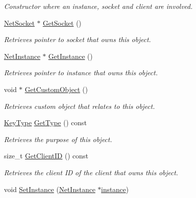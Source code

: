 \begin{DoxyCompactItemize}
\begin{DoxyCompactList}\small\item\em Constructor where an instance, socket and client are involved. \item\end{DoxyCompactList}\item 
\hyperlink{class_net_socket}{NetSocket} $\ast$ \hyperlink{class_completion_key_a9e785a464b4c5ade148d506d9e8eeeef}{GetSocket} ()
\begin{DoxyCompactList}\small\item\em Retrieves pointer to socket that owns this object. \item\end{DoxyCompactList}\item 
\hyperlink{class_net_instance}{NetInstance} $\ast$ \hyperlink{class_completion_key_a80c10491545d7a2de283e301d970b1d6}{GetInstance} ()
\begin{DoxyCompactList}\small\item\em Retrieves pointer to instance that owns this object. \item\end{DoxyCompactList}\item 
void $\ast$ \hyperlink{class_completion_key_acbf632d51b18ec2717be3f93b09ed52a}{GetCustomObject} ()
\begin{DoxyCompactList}\small\item\em Retrieves custom object that relates to this object. \item\end{DoxyCompactList}\item 
\hyperlink{class_completion_key_ad0789e8ca951edd8ee5b1b2fb7cdd8b4}{KeyType} \hyperlink{class_completion_key_a2d61a4bec4faff98ddacc896a89fe458}{GetType} () const 
\begin{DoxyCompactList}\small\item\em Retrieves the purpose of this object. \item\end{DoxyCompactList}\item 
size\_\-t \hyperlink{class_completion_key_ac42a83d6549a4fc3cfc9a336b08704f9}{GetClientID} () const 
\begin{DoxyCompactList}\small\item\em Retrieves the client ID of the client that owns this object. \item\end{DoxyCompactList}\item 
void \hyperlink{class_completion_key_a5055dfb3ac139408458f0f7469715195}{SetInstance} (\hyperlink{class_net_instance}{NetInstance} $\ast$\hyperlink{class_completion_key_a56e795d930e82555049fbf97c82f6493}{instance})

\end{DoxyCompactItemize}
